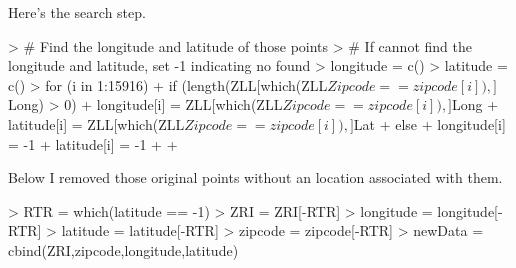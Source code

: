 \documentclass[a4paper]{article}
\begin{document}
Here's the search step.
\begin{Schunk}
\begin{Sinput}
> # Find the longitude and latitude of those points
> # If cannot find the longitude and latitude, set -1 indicating no found
> longitude = c()
> latitude = c()
> for (i in 1:15916) {
+   if (length(ZLL[which(ZLL$Zipcode == zipcode[i]),]$Long) > 0) {
+     longitude[i] = ZLL[which(ZLL$Zipcode == zipcode[i]),]$Long
+     latitude[i] = ZLL[which(ZLL$Zipcode == zipcode[i]),]$Lat
+   } else {
+     longitude[i] = -1
+     latitude[i] = -1
+   }
+ }
\end{Sinput}
\end{Schunk}
Below I removed those original points without an location associated with them.
\begin{Schunk}
\begin{Sinput}
> RTR = which(latitude == -1)
> ZRI = ZRI[-RTR]
> longitude = longitude[-RTR]
> latitude = latitude[-RTR]
> zipcode = zipcode[-RTR]
> newData = cbind(ZRI,zipcode,longitude,latitude)
\end{Sinput}
\end{Schunk}
\end{document}

